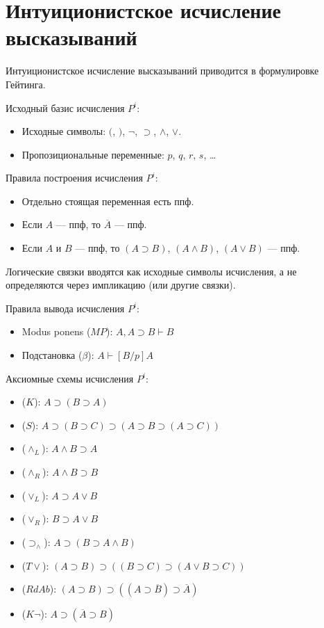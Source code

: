 \section{Интуиционистское исчисление высказываний}

\begin{remark}
    Интуиционистское исчисление высказываний приводится в формулировке Гейтинга.
\end{remark}

Исходный базис исчисления $P^i$:
\begin{itemize}
    \item Исходные символы: $($, $)$, $\lnot$, $\supset$, $\land$, $\lor$.
    \item Пропозициональные переменные: $p$, $q$, $r$, $s$, \dots
\end{itemize}

Правила построения исчисления $P^i$:
\begin{itemize}
    \item Отдельно стоящая переменная есть ппф.
    \item Если $A$ --- ппф, то $\overline{A}$ --- ппф.
    \item Если $A$ и $B$ --- ппф, то $(A \supset B)$, $(A \land B)$, $(A \lor B)$ --- ппф.
\end{itemize}
\begin{remark}
    Логические связки вводятся как исходные символы исчисления, а не определяются через импликацию (или другие связки).
\end{remark}

Правила вывода исчисления $P^i$:
\begin{itemize}
    \item Modus ponens ($MP$): $A, A \supset B \vdash B$
    \item Подстановка ($\beta$): $A \vdash [B/p]A$
\end{itemize}

Аксиомные схемы исчисления $P^i$:
\begin{itemize}
    \item ($K$): $A \supset (B \supset A)$
    \item ($S$): $A \supset (B \supset C) \supset (A \supset B \supset (A \supset C))$
    \item ($\land_L$): $A \land B \supset A$
    \item ($\land_R$): $A \land B \supset B$
    \item ($\lor_L$): $A \supset A \lor B$
    \item ($\lor_R$): $B \supset A \lor B$
    \item ($\supset_{\land}$): $A \supset (B \supset A \land B)$
    \item ($T\lor$): $(A \supset B) \supset ((B\supset C) \supset (A \lor B \supset C))$
    \item ($RdAb$): $(A \supset B) \supset ((A \supset \overline{B}) \supset \overline{A})$
    \item ($K\lnot$): $A \supset (\overline{A} \supset B)$
\end{itemize}

